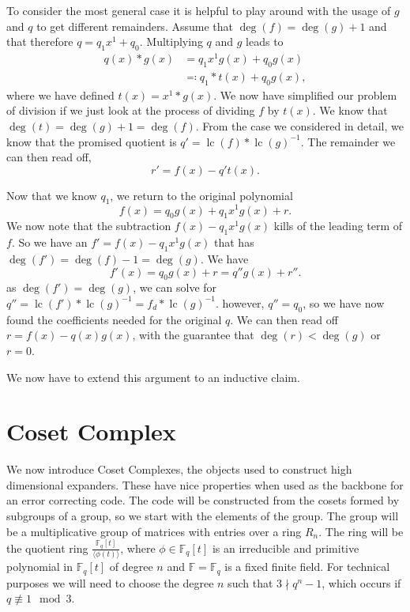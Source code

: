 \documentclass{article}
\DeclareMathOperator{\lc}{lc}
\begin{document}
To consider the most general case it is helpful to play around with the usage of $g$ and $q$ to get different remainders. Assume that $\deg(f) = \deg(g) + 1$ and that therefore $q = q_1 x^1 + q_0$. Multiplying $q$ and $g$ leads to 
\begin{align}
    q(x) * g(x) &= q_1 x^1 g(x) + q_0 g(x) \\
    &\eqqcolon q_1 * t(x) + q_0 g(x),
\end{align}
where we have defined $t(x) = x^1 * g(x)$. We now have simplified our problem of division if we just look at the process of dividing $f$ by $t(x)$. We know that $\deg(t) = \deg(g) + 1 = \deg(f)$. From the case we considered in detail, we know that the promised quotient is $q' = \lc(f) * \lc(g)^{-1}$. The remainder we can then read off,
\begin{equation}
    r' = f(x) - q' t(x).
\end{equation} 

Now that we know $q_1$, we return to the original polynomial
\begin{equation}
    f(x) = q_0 g(x) + q_1 x^1 g(x) + r.
\end{equation}
We now note that the subtraction $f(x) - q_1 x^1 g(x)$ kills of the leading term of $f$. So we have an $f' = f(x) - q_1 x^1 g(x)$ that has $\deg(f') = \deg(f) - 1 = \deg(g)$. We have
\begin{equation}
    f'(x) = q_0 g(x) + r = q'' g(x) + r''.
\end{equation}
as $\deg(f') = \deg(g)$, we can solve for $q'' = \lc(f') * \lc(g)^{-1} = f_{d} * \lc(g)^{-1}$. however, $q'' = q_0$, so we have now found the coefficients needed for the original $q$. We can then read off $r = f(x) - q(x) g(x)$, with the guarantee that $\deg(r) < \deg(g)$ or $r = 0$. 

We now have to extend this argument to an inductive claim.


\section{Coset Complex}
We now introduce Coset Complexes, the objects used to construct high dimensional expanders. These have nice properties when used as the backbone for an error correcting code. The code will be constructed from the cosets formed by subgroups of a group, so we start with the elements of the group. The group will be a multiplicative group of matrices with entries over a ring $R_n$. The ring will be the quotient ring $\frac{\mathbb{F}_q[t]}{\langle \phi(t) \rangle}$, where $\phi \in \mathbb{F}_q[t]$ is an irreducible and primitive polynomial in $\mathbb{F}_q [t]$ of degree $n$ and $\mathbb{F} = \mathbb{F}_q$ is a fixed finite field. For technical purposes we will need to choose the degree $n$ such that $3 \nmid q^n - 1$, which occurs if $q \not\equiv 1 \mod 3$. 
\end{document}
